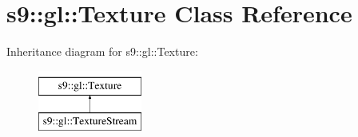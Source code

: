 \hypertarget{classs9_1_1gl_1_1Texture}{\section{s9\-:\-:gl\-:\-:\-Texture \-Class \-Reference}
\label{classs9_1_1gl_1_1Texture}
}
\-Inheritance diagram for s9\-:\-:gl\-:\-:\-Texture\-:\begin{figure}[H]
\begin{center}
\leavevmode
\includegraphics[height=2.000000cm]{classs9_1_1gl_1_1Texture}
\end{center}
\end{figure}
